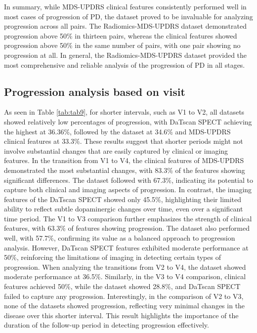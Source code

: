 \documentclass{article}
\begin{document}
In summary, while MDS-UPDRS clinical features consistently performed well in most cases of progression of PD, the dataset proved to be invaluable for analyzing progression across all pairs. The Radiomics-MDS-UPDRS dataset demonstrated progression above 50\% in thirteen pairs, whereas the clinical features showed progression above 50\% in the same number of pairs, with one pair showing no progression at all. In general, the Radiomics-MDS-UPDRS dataset provided the most comprehensive and reliable analysis of the progression of PD in all stages.



\subsection{Progression analysis based on visit}
As seen in Table \ref{tab:tab9}, for shorter intervals, such as V1 to V2, all datasets showed relatively low percentages of progression, with DaTscan SPECT achieving the highest at 36.36\%, followed by the dataset at 34.6\% and MDS-UPDRS clinical features at 33.3\%. These results suggest that shorter periods might not involve substantial changes that are easily captured by clinical or imaging features. In the transition from V1 to V4, the clinical features of MDS-UPDRS demonstrated the most substantial changes, with 83.3\% of the features showing significant differences. The dataset followed with 67.3\%, indicating its potential to capture both clinical and imaging aspects of progression. In contrast, the imaging features of the DaTscan SPECT showed only 45.5\%, highlighting their limited ability to reflect subtle dopaminergic changes over time, even over a significant time period. The V1 to V3 comparison further emphasizes the strength of clinical features, with 63.3\% of features showing progression. The dataset also performed well, with 57.7\%, confirming its value as a balanced approach to progression analysis. However, DaTscan SPECT features exhibited moderate performance at 50\%, reinforcing the limitations of imaging in detecting certain types of progression. When analyzing the transitions from V2 to V4, the dataset showed moderate performance at 36.5\%. Similarly, in the V3 to V4 comparison, clinical features achieved 50\%, while the dataset showed 28.8\%, and DaTscan SPECT failed to capture any progression. Interestingly, in the comparison of V2 to V3, none of the datasets showed progression, reflecting very minimal changes in the disease over this shorter interval. This result highlights the importance of the duration of the follow-up period in detecting progression effectively.
\end{document}
